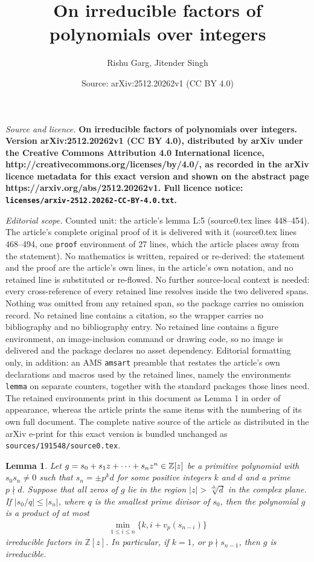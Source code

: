 \documentclass[10pt,a4paper]{amsart}
\title{\bf On irreducible factors of polynomials over integers}
\author{Rishu Garg, Jitender Singh}
\date{Source: arXiv:2512.20262v1 (CC BY 4.0)}
\newtheorem{lemma}{Lemma}
\begin{document}
\maketitle

\noindent\emph{Source and licence.} \bf On irreducible factors of polynomials over integers. Version arXiv:2512.20262v1 (CC BY 4.0), distributed by arXiv under the Creative Commons Attribution 4.0 International licence, http://creativecommons.org/licenses/by/4.0/, as recorded in the arXiv licence metadata for this exact version and shown on the abstract page https://arxiv.org/abs/2512.20262v1. Full licence notice: \texttt{licenses/arxiv-2512.20262-CC-BY-4.0.txt}.\par\smallskip

\noindent\textit{Editorial scope.} Counted unit: the article's lemma L:5 (source0.tex lines 448--454). The article's complete original proof of it is delivered with it (source0.tex lines 468--494, one \texttt{proof} environment of 27 lines, which the article places away from the statement). No mathematics is written, repaired or re-derived: the statement and the proof are the article's own lines, in the article's own notation, and no retained line is substituted or re-flowed.  No further source-local context is needed: every cross-reference of every retained line resolves inside the two delivered spans.  Nothing was omitted from any retained span, so the package carries no omission record.  No retained line contains a citation, so the wrapper carries no bibliography and no bibliography entry.  No retained line contains a figure environment, an image-inclusion command or drawing code, so no image is delivered and the package declares no asset dependency.  Editorial formatting only, in addition: an AMS \texttt{amsart} preamble that restates the article's own declarations and macros used by the retained lines, namely the environments \texttt{lemma} on separate counters, together with the standard packages those lines need.  The retained environments print in this document as Lemma 1 in order of appearance, whereas the article prints the same items with the numbering of its own full document.  The complete native source of the article as distributed in the arXiv e-print for this exact version is bundled unchanged as \texttt{sources/191548/source0.tex}.
\begin{lemma}\label{L:5}
Let $g = s_0 + s_1z +\cdots+s_n z^n\in \Bbb{Z}[z]$ be a primitive polynomial with $s_0s_n\neq 0$ such that $s_n=\pm p^k d$ for some  positive integers $k$ and $d$ and a prime $p\nmid d$. Suppose that all zeros of $g$ lie in the region $|z|>\sqrt[\Delta_f]{d}$ in the complex plane.  If $|s_0/q|\leq |s_n|$, where $q$ is the smallest prime divisor of $s_0$, then the polynomial $g$ is a product of at most
\begin{eqnarray*}
\min_{1\leq i\leq n}\{k,i+v_p(s_{n-i})\}
\end{eqnarray*}
irreducible factors in $\mathbb{Z}[z]$. In particular, if $k=1$, or $p\nmid s_{n-1}$, then $g$ is irreducible.
\end{lemma}
\end{document}
